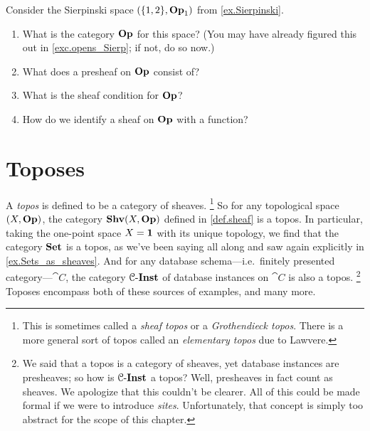 \documentclass[7Sketches]{subfiles}
\begin{document}
\begin{exercise}%
\label{exc.sierpinski}%
Consider the Sierpinski space $(\{1,2\},\mathbf{Op}_1)$ from \cref{ex.Sierpinski}.
\begin{enumerate}
	\item What is the category $\mathbf{Op}$ for this space? (You may have already figured this out in \cref{exc.opens_Sierp}; if not, do so now.)
	\item What does a presheaf on $\mathbf{Op}$ consist of?
	\item What is the sheaf condition for $\mathbf{Op}$?
	\item How do we identify a sheaf on $\mathbf{Op}$ with a function?
	\qedhere
\end{enumerate}
\end{exercise}



%


\section{Toposes} %
\label{subsec.topos_logic} %
\label{subsec.def_and_properties_toposes}
%

A \emph{topos} is defined to be a category of sheaves.%
\footnote{This is sometimes called a \emph{sheaf topos} or a \emph{Grothendieck topos}. There is a more general sort of topos called an \emph{elementary topos} due to Lawvere.}%
%
So for any topological space $(X,\mathbf{Op})$, the category $\mathbf{Shv}(X,\mathbf{Op})$ defined in
\cref{def.sheaf} is a topos. In particular, taking the one-point space $X =\mathbf{1}$ with its unique topology, we find that the category
$\mathbf{Set}$ is a topos, as we've been saying all along and saw again explicitly in \cref{ex.Sets_as_sheaves}. And for any database schema---i.e.\ finitely presented category---$\cat{C}$, the category $\mathcal{C}\textnormal{-}\mathbf{Inst}$ of database instances on $\cat{C}$ is also a topos.%
\footnote{We said that a topos is a category of sheaves, yet database instances are presheaves; so how is $\mathcal{C}\textnormal{-}\mathbf{Inst}$ a topos? Well, presheaves in fact count as sheaves. We apologize that this couldn't be clearer. All of this could be made formal if we were to introduce \emph{sites}. Unfortunately, that concept is simply too abstract for the scope of this chapter.}
Toposes encompass both of these sources of examples, and many more.
\end{document}

